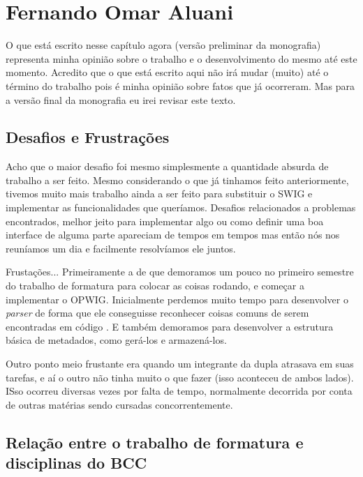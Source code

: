 \chapter{Fernando Omar Aluani}
\label{sec:omar_subjetiva}

\begin{framed}
  O que está escrito nesse capítulo agora (versão preliminar da monografia) 
  representa minha opinião sobre o trabalho e o desenvolvimento do mesmo
  até este momento. Acredito que o que está escrito aqui não irá mudar (muito)
  até o término do trabalho pois é minha opinião sobre fatos que já ocorreram.
  Mas para a versão final da monografia eu irei revisar este texto.
\end{framed}

\section{Desafios e Frustrações}
\label{sec:omar:desafios_frustracoes}

Acho que o maior desafio foi mesmo simplesmente a quantidade absurda de trabalho a
ser feito. Mesmo considerando o que já tinhamos feito anteriormente, tivemos muito
mais trabalho ainda a ser feito para substituir o SWIG e implementar as funcionalidades
que queríamos. Desafios relacionados a problemas encontrados, melhor jeito para
implementar algo ou como definir uma boa interface de alguma parte apareciam de
tempos em tempos mas então nós nos reuníamos um dia e facilmente resolvíamos ele juntos.

Frustações... Primeiramente a de que demoramos um pouco no primeiro semestre do 
trabalho de formatura para colocar as coisas rodando, e começar a implementar o 
OPWIG. Inicialmente perdemos muito tempo para desenvolver o \textit{parser}
de forma que ele conseguisse reconhecer coisas comuns de serem encontradas
em código \CXX{}. E também demoramos para desenvolver a estrutura básica de 
metadados, como gerá-los e armazená-los.

Outro ponto meio frustante era quando um integrante da dupla atrasava em suas tarefas,
e aí o outro não tinha muito o que fazer (isso aconteceu de ambos lados). ISso
ocorreu diversas vezes por falta de tempo, normalmente decorrida por conta de
outras matérias sendo cursadas concorrentemente.

\section{Relação entre o trabalho de formatura e disciplinas do BCC}
\label{sec:omar:relacao_disciplinas_bcc}

